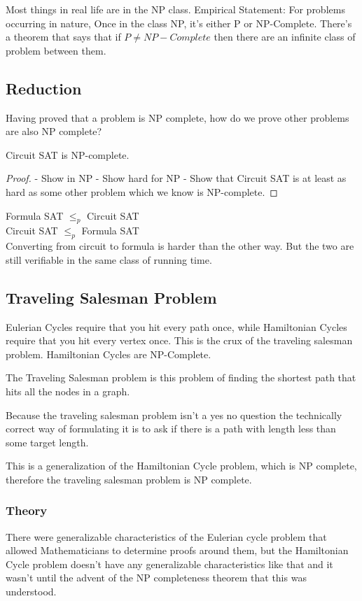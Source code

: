 \documentclass[english, 10pt]{article}
\begin{document}
Most things in real life are in the NP class. Empirical Statement: For problems
occurring in nature, Once in the class NP, it's either P or NP-Complete.
There's a theorem that says that if $P \neq NP-Complete$ then there are an
infinite class of problem between them.

\subsection{Reduction}
Having proved that a problem is NP complete, how do we prove other problems are also NP complete?

\begin{thrm}
    Circuit SAT is NP-complete.
\end{thrm}

\begin{proof}
    - Show in NP
    - Show hard for NP
    - Show that Circuit SAT is at least as hard as some other problem which we know is NP-complete.
\end{proof}

Formula SAT $\le_p$ Circuit SAT \\
Circuit SAT $\le_p$ Formula SAT \\

Converting from circuit to formula is harder than the other way. But the two
are still verifiable in the same class of running time.

\subsection{Traveling Salesman Problem}
Eulerian Cycles require that you hit every path once, while Hamiltonian Cycles
require that you hit every vertex once. This is the crux of the traveling
salesman problem. Hamiltonian Cycles are NP-Complete.

The Traveling Salesman problem is this problem of finding the shortest path that hits all the nodes in a graph.

Because the traveling salesman problem isn't a yes no question the technically
correct way of formulating it is to ask if there is a path with length less
than some target length.

This is a generalization of the Hamiltonian Cycle problem, which is NP
complete, therefore the traveling salesman problem is NP complete.

\subsubsection{Theory}
There were generalizable characteristics of the Eulerian cycle problem that
allowed Mathematicians to determine proofs around them, but the Hamiltonian
Cycle problem doesn't have any generalizable characteristics like that and it
wasn't until the advent of the NP completeness theorem that this was
understood.
\end{document}
